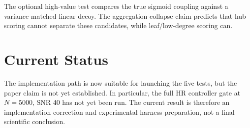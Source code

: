 \documentclass[11pt]{article}
\begin{document}
The optional high-value test compares the true sigmoid coupling against a
variance-matched linear decoy.  The aggregation-collapse claim predicts that
hub scoring cannot separate these candidates, while leaf/low-degree scoring can.

\section{Current Status}

The implementation path is now suitable for launching the five tests, but the
paper claim is not yet established.  In particular, the full HR controller gate
at $N=5000$, SNR 40 has not yet been run.  The current result is therefore an
implementation correction and experimental harness preparation, not a final
scientific conclusion.
\end{document}

